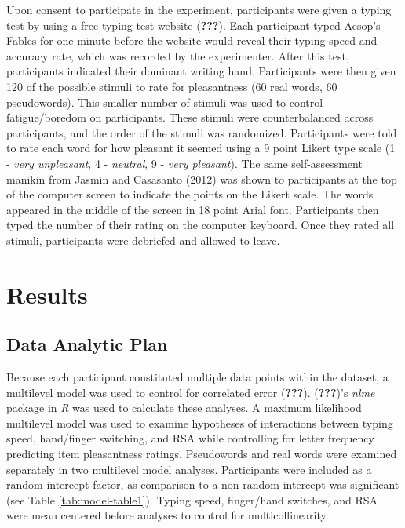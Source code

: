 \documentclass[english,man]{apa6}
\theoremstyle{definition}
\theoremstyle{definition}
\theoremstyle{definition}
\theoremstyle{remark}
\begin{document}
Upon consent to participate in the experiment, participants were given a
typing test by using a free typing test website ({\textbf{???}}). Each
participant typed Aesop's Fables for one minute before the website would
reveal their typing speed and accuracy rate, which was recorded by the
experimenter. After this test, participants indicated their dominant
writing hand. Participants were then given 120 of the possible stimuli
to rate for pleasantness (60 real words, 60 pseudowords). This smaller
number of stimuli was used to control fatigue/boredom on participants.
These stimuli were counterbalanced across participants, and the order of
the stimuli was randomized. Participants were told to rate each word for
how pleasant it seemed using a 9 point Likert type scale (1 - \emph{very
unpleasant}, 4 - \emph{neutral}, 9 - \emph{very pleasant}). The same
self-assessment manikin from Jasmin and Casasanto (2012) was shown to
participants at the top of the computer screen to indicate the points on
the Likert scale. The words appeared in the middle of the screen in 18
point Arial font. Participants then typed the number of their rating on
the computer keyboard. Once they rated all stimuli, participants were
debriefed and allowed to leave.

\section{Results}\label{results}

\subsection{Data Analytic Plan}\label{data-analytic-plan}

Because each participant constituted multiple data points within the
dataset, a multilevel model was used to control for correlated error
({\textbf{???}}). ({\textbf{???}})'s \emph{nlme} package in \emph{R} was
used to calculate these analyses. A maximum likelihood multilevel model
was used to examine hypotheses of interactions between typing speed,
hand/finger switching, and RSA while controlling for letter frequency
predicting item pleasantness ratings. Pseudowords and real words were
examined separately in two multilevel model analyses. Participants were
included as a random intercept factor, as comparison to a non-random
intercept was significant (see Table \ref{tab:model-table1}). Typing
speed, finger/hand switches, and RSA were mean centered before analyses
to control for multicollinearity.
\end{document}
